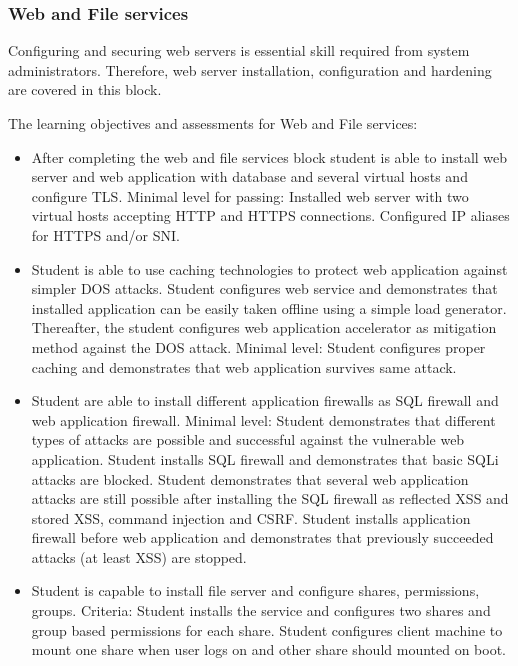 \subsubsection{Web and File services}
Configuring and securing web servers is essential skill required from system administrators. Therefore, web server installation, configuration and hardening are covered in this block.

The learning objectives and assessments for Web and File services:
\begin{itemize}
\item After completing the web and file services block student is able to install web server and web application with database and several virtual hosts and configure \gls{TLS}. Minimal level for passing: Installed web server with two virtual hosts accepting \gls{HTTP} and \gls{HTTPS} connections. Configured IP aliases for \gls{HTTPS} and/or \gls{SNI}.
\item Student is able to use caching technologies to protect web application against simpler \gls{DOS} attacks. Student configures web service and demonstrates that installed application can be easily taken offline using a simple load generator. Thereafter, the student configures web application accelerator as mitigation method against the  \gls{DOS} attack. Minimal level: Student configures proper caching and demonstrates that web application survives same attack.
\item Student are able to install different application firewalls as \gls{SQL} firewall and web application firewall. Minimal level: Student demonstrates that different types of attacks are possible and successful against the vulnerable web application. Student installs \gls{SQL} firewall and demonstrates that basic \gls{SQLi} attacks are blocked. Student demonstrates that several web application attacks are still possible after installing the \gls{SQL} firewall as reflected \gls{XSS} and stored \gls{XSS}, command injection and \gls{CSRF}. Student installs application firewall before web application and demonstrates that previously succeeded attacks (at least \gls{XSS}) are stopped.
\item Student is capable to install file server and configure shares, permissions, groups. Criteria: Student installs the service and configures two shares and group based permissions for each share. Student configures client machine to mount one share when user logs on and other share should mounted on boot.
\end{itemize}


